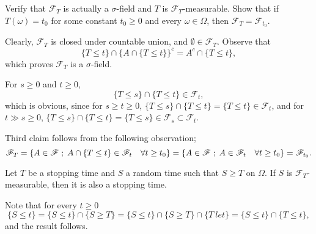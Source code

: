 \documentclass{report}
\begin{document}
\setcounter{exe}{12}
\begin{prob}
	Verify that \( \mathscr{F}_T \) is actually a \( \sigma \)-field and \( T \) is
	\( \mathscr{F}_T \)-measurable. Show that if \( T(\omega)=t_0 \) for some constant \( t_0\ge0 \)
	and every \( \omega \in \Omega \), then \( \mathscr{F}_T=\mathscr{F}_{t_0} \).
\end{prob}
\begin{prf}
	Clearly, \( \mathscr{F}_T \) is closed under countable union, and
	\( \emptyset \in \mathscr{F}_T \).
	Observe that
	\[
		\{T\le t\}\cap \{A \cap \{ T \le t \} \} ^c = A^c \cap \{T \le t\},
	\]
	which proves \( \mathscr{F}_T \) is a \( \sigma \)-field.
	
	For \( s\ge 0 \) and \( t\ge 0 \),
	\[
		\{T\le s\}\cap \{T\le t\}\in \mathscr{F}_t,
	\]
	which is obvious, since for \( s\ge t\ge 0 \), \( \{T\le s\}\cap \{T\le t\}=\{T\le t\}\in \mathscr{F}_t \),
	and for \( t\gg s\ge 0 \),
	\( \{T\le s\}\cap \{T\le t\}=\{T\le s\}\in \mathscr{F}_s \subset \mathscr{F}_t \).
	
	Third claim follows from the following observation;
	\[
		\mathscr{F}_T
		= \{A\in \mathscr{F}\;;\;A \cap \{ T \le t\}\in \mathscr{F}_t\quad \forall t\ge t_0\}
		=\{A\in \mathscr{F}\;;\;A\in \mathscr{F}_t\quad \forall t\ge t_0\} \\
		=\mathscr{F}_{t_0}.
	\]
\end{prf}

\begin{exe}
	Let \( T \) be a stopping time and \( S \) a random time such that \( S\ge T \) on \( \Omega \).
	If \( S \) is \( \mathscr{F}_{T} \)-measurable, then it is also a stopping time.
\end{exe}
\begin{prf}
	Note that for every \( t\ge 0 \)
	\[ \{ S\le t\}=\{S\le t\}\cap \{S\ge T\}=\{S\le t\} \cap \{S\ge T\} \cap \{ T\ le t\}=\{S\le t\} \cap \{ T \le t\},\]
	and the result follows.
\end{prf}
\end{document}
